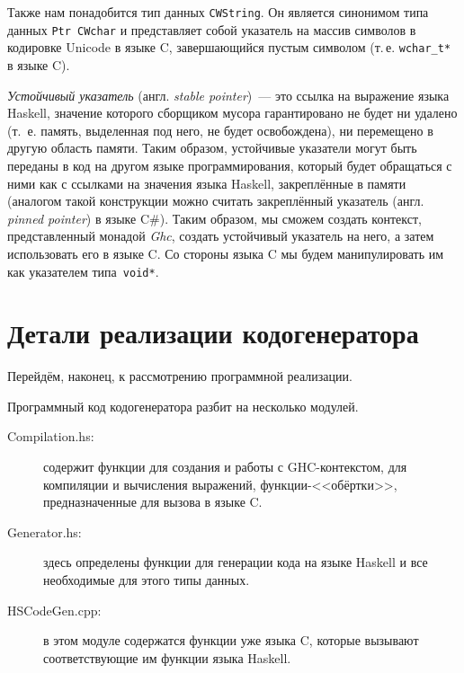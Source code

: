 	Также нам понадобится тип данных \lstinline{CWString}. Он является синонимом типа данных \lstinline{Ptr CWchar} и представляет собой указатель на массив символов в кодировке Unicode в языке C, завершающийся пустым символом (т.\,е. \lstinline{wchar_t*} в языке C).
	
	\textit{Устойчивый указатель} (англ. \textit{stable pointer})~--- это ссылка на выражение языка Haskell, значение которого сборщиком мусора гарантировано не будет ни удалено (т.~е. память, выделенная под него, не будет освобождена), ни перемещено в другую область памяти. Таким образом, устойчивые указатели могут быть переданы в код на другом языке программирования, который будет обращаться с ними как с ссылками на значения языка Haskell, закреплённые в памяти (аналогом такой конструкции можно считать закреплённый указатель (англ. \textit{pinned pointer}) в языке C\#). Таким образом, мы сможем создать контекст, представленный монадой \textit{Ghc}, создать устойчивый указатель на него, а затем использовать его в языке C. Со стороны языка C мы будем манипулировать им как указателем типа~\lstinline{void*}.   %

\section{Детали реализации кодогенератора}
Перейдём, наконец, к рассмотрению программной реализации.

Программный код кодогенератора разбит на несколько модулей. 
\begin{description}
	\item[Compilation.hs:] содержит функции для создания и работы с GHC-контекстом, для компиляции и вычисления выражений, функции-<<обёртки>>, предназначенные для вызова в языке C.
	\item[Generator.hs:] здесь определены функции для генерации кода на языке Haskell и все необходимые для этого типы данных.
	\item[HSCodeGen.cpp:] в этом модуле содержатся функции уже языка C, которые вызывают соответствующие им функции языка Haskell.
\end{description}
